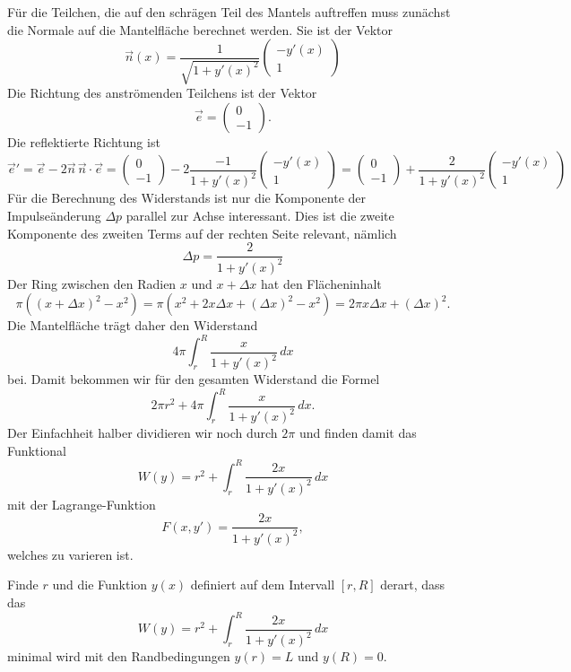 Für die Teilchen, die auf den schrägen Teil des Mantels auftreffen
muss zunächst die Normale auf die Mantelfläche berechnet werden.
Sie ist der Vektor
\[
\vec{n}(x)
=
\frac{1}{\sqrt{1+y'(x)^2}}
\begin{pmatrix}
-y'(x)\\
1
\end{pmatrix}
\]
Die Richtung des anströmenden Teilchens ist der Vektor
\[
\vec{e}
=
\begin{pmatrix}
 0\\
-1
\end{pmatrix}.
\]
Die reflektierte Richtung ist
\[
\vec{e}'
=
\vec{e}
-2\vec{n}\,\vec{n}\cdot\vec{e}
=
\begin{pmatrix} 0\\ -1 \end{pmatrix}
-2
\frac{-1}{1+y'(x)^2}
\begin{pmatrix}
-y'(x)\\
1
\end{pmatrix}
=
\begin{pmatrix}0\\-1\end{pmatrix}
+
\frac{2}{1+y'(x)^2}\begin{pmatrix}-y'(x)\\1\end{pmatrix}
\]
Für die Berechnung des Widerstands ist nur die Komponente der
Impulseänderung $\Delta p$ parallel zur Achse interessant.
Dies ist die zweite Komponente des zweiten Terms auf der rechten
Seite relevant, nämlich
\[
\Delta p
=
\frac{2}{1+y'(x)^2}
\]
Der Ring zwischen den Radien $x$ und $x+\Delta x$ hat den Flächeninhalt
\[
\pi ((x+\Delta x)^2 - x^2)
=
\pi (x^2 +2x\Delta x + (\Delta x)^2 - x^2)
=
2\pi x \Delta x + (\Delta x)^2.
\]
Die Mantelfläche trägt daher den Widerstand
\begin{equation*}
4\pi
\int_{r}^{R}
\frac{x}{1+y'(x)^2}\,dx
\end{equation*}
bei.
Damit bekommen wir für den gesamten Widerstand die Formel
\[
2\pi r^2 + 4\pi \int_r^R \frac{x}{1+y'(x)^2}\,dx.
\]
Der Einfachheit halber dividieren wir noch durch $2\pi$ und finden
damit das Funktional
\begin{equation}
W(y)
=
r^2 
+
\int_r^R \frac{2x}{1+y'(x)^2}\,dx
\end{equation}
mit der Lagrange-Funktion
\[
F(x,y')
=
\frac{2x}{1+y'(x)^2},
\]
welches zu varieren ist.

\begin{aufgabe}
\label{widerstand:aufgabe}
Finde $r$ und die Funktion $y(x)$ definiert auf dem Intervall $[r,R]$
derart, dass das
\begin{equation}
W(y)
=
r^2
+
\int_r^R \frac{2x}{1+y'(x)^2}\,dx
\label{widerstand:eqn:Wy}
\end{equation}
minimal wird mit den Randbedingungen
$y(r)=L$ und $y(R)=0$.
\end{aufgabe}
